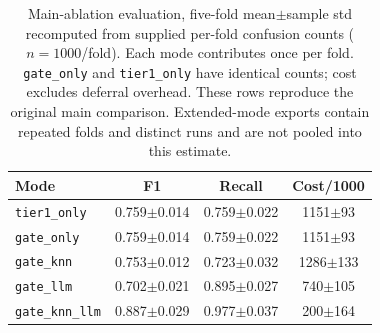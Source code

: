 \begin{table}[!t]
\centering
\caption{Main-ablation evaluation, five-fold mean$\pm$sample std recomputed from supplied per-fold confusion counts ($n{=}1000$/fold). Each mode contributes once per fold. \texttt{gate\_only} and \texttt{tier1\_only} have identical counts; cost excludes deferral overhead. These rows reproduce the original main comparison. Extended-mode exports contain repeated folds and distinct runs and are not pooled into this estimate.}
\label{tab:ablationmean}
\begin{tabular}{lccc}
\toprule
Mode & F1 & Recall & Cost/1000 \\
\midrule
\texttt{tier1\_only} & 0.759$\pm$0.014 & 0.759$\pm$0.022 & 1151$\pm$93 \\
\texttt{gate\_only}  & 0.759$\pm$0.014 & 0.759$\pm$0.022 & 1151$\pm$93 \\
\texttt{gate\_knn}   & 0.753$\pm$0.012 & 0.723$\pm$0.032 & 1286$\pm$133 \\
\texttt{gate\_llm}   & 0.702$\pm$0.021 & 0.895$\pm$0.027 & 740$\pm$105 \\
\texttt{gate\_knn\_llm} & 0.887$\pm$0.029 & 0.977$\pm$0.037 & 200$\pm$164 \\
\bottomrule
\end{tabular}
\end{table}
